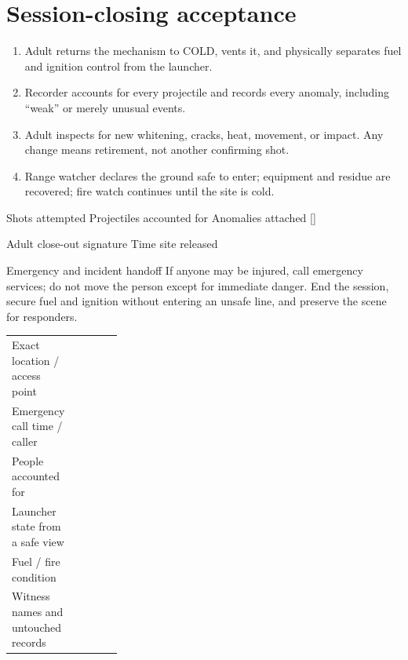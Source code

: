 \section{Session-closing acceptance}
\begin{enumerate}
\item Adult returns the mechanism to COLD, vents it, and physically separates
fuel and ignition control from the launcher.
\item Recorder accounts for every projectile and records every anomaly,
including ``weak'' or merely unusual events.
\item Adult inspects for new whitening, cracks, heat, movement, or impact. Any
change means retirement, not another confirming shot.
\item Range watcher declares the ground safe to enter; equipment and residue
are recovered; fire watch continues until the site is cold.
\end{enumerate}
\begin{telosframe}
Shots attempted \hrulefill\quad Projectiles accounted for \hrulefill\quad
Anomalies attached [\quad]\par
\vspace{.65em}
Adult close-out signature \hrulefill\quad Time site released \hrulefill
\end{telosframe}

\begin{teloscard}{Emergency and incident handoff}
If anyone may be injured, call emergency services; do not move the person except
for immediate danger. End the session, secure fuel and ignition without entering
an unsafe line, and preserve the scene for responders.

\begin{tabularx}{\linewidth}{@{}p{0.28\linewidth}L@{}}
Exact location / access point & \hrulefill\\[.8em]
Emergency call time / caller & \hrulefill\\[.8em]
People accounted for & \hrulefill\\[.8em]
Launcher state from a safe view & \hrulefill\\[.8em]
Fuel / fire condition & \hrulefill\\[.8em]
Witness names and untouched records & \hrulefill\\
\end{tabularx}
\end{teloscard}

